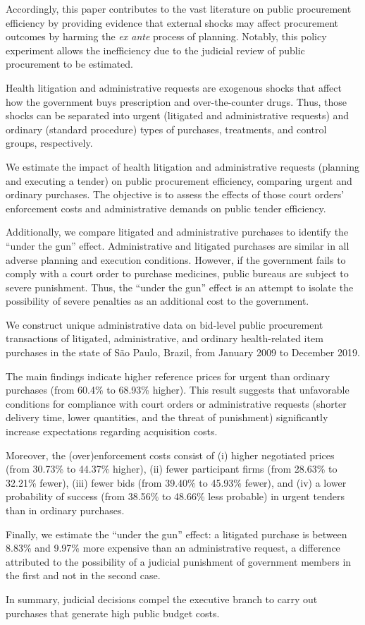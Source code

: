 Accordingly, this paper contributes to the vast literature on public procurement efficiency \citep{bandiera2009active, ashraf2016dogooders, lewisfaupel2016can} by providing evidence that external shocks may affect procurement outcomes by harming the \textit{ex ante} process of planning. Notably, this policy experiment allows the inefficiency due to the judicial review of public procurement to be estimated.

Health litigation and administrative requests are exogenous shocks that affect how the government buys prescription and over-the-counter drugs. Thus, those shocks can be separated into urgent (litigated and administrative requests) and ordinary (standard procedure) types of purchases, treatments, and control groups, respectively.

We estimate the impact of health litigation and administrative requests (planning and executing a tender) on public procurement efficiency, comparing urgent and ordinary purchases. The objective is to assess the effects of those court orders’ enforcement costs and administrative demands on public tender efficiency.

Additionally, we compare litigated and administrative purchases to identify the “under the gun” effect. Administrative and litigated purchases are similar in all adverse planning and execution conditions. However, if the government fails to comply with a court order to purchase medicines, public bureaus are subject to severe punishment. Thus, the “under the gun” effect is an attempt to isolate the possibility of severe penalties as an additional cost to the government.

We construct unique administrative data on bid-level public procurement transactions of litigated, administrative, and ordinary health-related item purchases in the state of São Paulo, Brazil, from January 2009 to December 2019.

The main findings indicate higher reference prices for urgent than ordinary purchases (from 60.4\% to 68.93\% higher). This result suggests that unfavorable conditions for compliance with court orders or administrative requests (shorter delivery time, lower quantities, and the threat of punishment) significantly increase expectations regarding acquisition costs.

Moreover, the (over)enforcement costs consist of (i) higher negotiated prices (from 30.73\% to 44.37\% higher), (ii) fewer participant firms (from 28.63\% to 32.21\% fewer), (iii) fewer bids (from 39.40\% to 45.93\% fewer), and (iv) a lower probability of success (from 38.56\% to 48.66\% less probable) in urgent tenders than in ordinary purchases.

Finally, we estimate the “under the gun” effect: a litigated purchase is between 8.83\% and 9.97\% more expensive than an administrative request, a difference attributed to the possibility of a judicial punishment of government members in the first and not in the second case.

In summary, judicial decisions compel the executive branch to carry out purchases that generate high public budget costs.